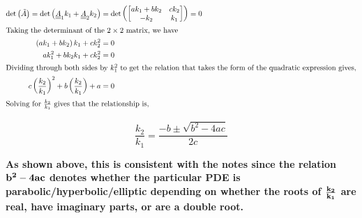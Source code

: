 \begin{adjustwidth}{2.5em}{0pt}
\begin{align*}
        \det{\left(\tilde{A}\right)} = \det{\left(\underline{\underline{A}}_1k_1 + \underline{\underline{A}}_2k_2\right)} & = \det{\left(\begin{bmatrix}
            ak_1 + bk_2 & ck_2\\ -k_2 & k_1
        \end{bmatrix}\right)} = 0\\
        \shortintertext{Taking the determinant of the $2\times 2$ matrix, we have}
        \left(ak_1 + bk_2\right)k_1 + ck_2^2 & = 0\\
        ak_1^2 + bk_2k_1 + ck_2^2 & = 0\\
        \shortintertext{Dividing through both sides by $k_1^2$ to get the relation that takes the form of the quadratic expression gives,}
        c\left(\frac{k_2}{k_1}\right)^2 + b \left(\frac{k_2}{k_1}\right) + a & = 0\\
        \shortintertext{Solving for $\frac{k_2}{k_1}$ gives that the relationship is,}
    \end{align*}

    \vspace{-0.5in}
    \begin{equation*}
        \boxed{\frac{k_2}{k_1} = \frac{-b\pm \sqrt{b^2 - 4ac}}{2c}}
    \end{equation*}

    \begin{fminipage}{0.8\linewidth}
        \textbf{As shown above, this is consistent with the notes since the relation $\bf b^2 - 4ac$ denotes whether the particular PDE is parabolic/hyperbolic/elliptic depending on whether the roots of $\bf \frac{k_2}{k_1}$ are real, have imaginary parts, or are a double root.}
    \end{fminipage}
\end{adjustwidth}
